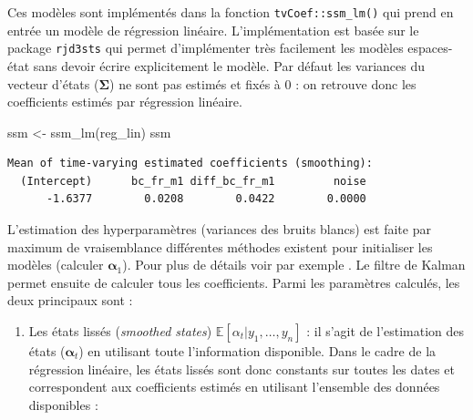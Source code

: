 \documentclass[
  a4paper,
  DIV=11,
  numbers=noendperiod,
  french]{scrartcl}
\newenvironment{Shaded}{\begin{snugshade}}{\end{snugshade}}
\newcommand{\AttributeTok}[1]{\textcolor[rgb]{0.40,0.45,0.13}{#1}}
\newcommand{\DecValTok}[1]{\textcolor[rgb]{0.68,0.00,0.00}{#1}}
\newcommand{\FunctionTok}[1]{\textcolor[rgb]{0.28,0.35,0.67}{#1}}
\newcommand{\NormalTok}[1]{\textcolor[rgb]{0.00,0.23,0.31}{#1}}
\newcommand{\OtherTok}[1]{\textcolor[rgb]{0.00,0.23,0.31}{#1}}
\newcommand{\SpecialCharTok}[1]{\textcolor[rgb]{0.37,0.37,0.37}{#1}}
\providecommand{\tightlist}{%
  \setlength{\itemsep}{0pt}\setlength{\parskip}{0pt}}\usepackage{longtable,booktabs,array}
\newcommand\1{{\mathds 1}}
\newcommand{\bf}[1]{{\boldsymbol #1}}
\newcommand{\E}[1]{\mathbb{E}\left[#1\right]}
\theoremstyle{remark}
\begin{document}
Ces modèles sont implémentés dans la fonction \texttt{tvCoef::ssm\_lm()}
qui prend en entrée un modèle de régression linéaire. L'implémentation
est basée sur le package \texttt{rjd3sts} \autocite{rjd3sts} qui permet
d'implémenter très facilement les modèles espaces-état sans devoir
écrire explicitement le modèle. Par défaut les variances du vecteur
d'états (\(\bf \Sigma\)) ne sont pas estimés et fixés à 0 : on retrouve
donc les coefficients estimés par régression linéaire.

\begin{Shaded}
\begin{Highlighting}[]
\NormalTok{ssm }\OtherTok{\textless{}{-}} \FunctionTok{ssm\_lm}\NormalTok{(reg\_lin)}
\NormalTok{ssm}
\end{Highlighting}
\end{Shaded}

\begin{verbatim}
Mean of time-varying estimated coefficients (smoothing): 
  (Intercept)      bc_fr_m1 diff_bc_fr_m1         noise 
      -1.6377        0.0208        0.0422        0.0000 
\end{verbatim}

L'estimation des hyperparamètres (variances des bruits blancs) est faite
par maximum de vraisemblance différentes méthodes existent pour
initialiser les modèles (calculer \(\bf \alpha_1\)). Pour plus de
détails voir par exemple \textcite{durbinkoopman}. Le filtre de Kalman
permet ensuite de calculer tous les coefficients. Parmi les paramètres
calculés, les deux principaux sont :

\begin{enumerate}
\def\labelenumi{\arabic{enumi}.}
\tightlist
\item
  Les états lissés (\emph{smoothed states})
  \(\E{\alpha_t|y_1,\dots,y_n}\) : il s'agit de l'estimation des états
  (\(\bf\alpha_t\)) en utilisant toute l'information disponible. Dans le
  cadre de la régression linéaire, les états lissés sont donc constants
  sur toutes les dates et correspondent aux coefficients estimés en
  utilisant l'ensemble des données disponibles :
\end{enumerate}

\begin{Shaded}
\end{Shaded}
\end{document}
